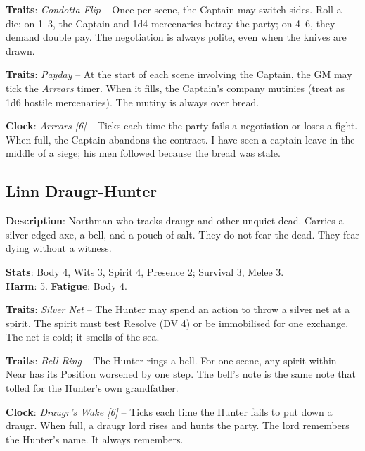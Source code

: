 \noindent\textbf{Traits}: \emph{Condotta Flip} -- Once per scene, the Captain may switch sides. Roll a die: on 1--3, the Captain and 1d4 mercenaries betray the party; on 4--6, they demand double pay. The negotiation is always polite, even when the knives are drawn.

\noindent\textbf{Traits}: \emph{Payday} -- At the start of each scene involving the Captain, the GM may tick the \emph{Arrears} timer. When it fills, the Captain's company mutinies (treat as 1d6 hostile mercenaries). The mutiny is always over bread.

\noindent\textbf{Clock}: \emph{Arrears [6]} -- Ticks each time the party fails a negotiation or loses a fight. When full, the Captain abandons the contract. I have seen a captain leave in the middle of a siege; his men followed because the bread was stale.


\subsection*{Linn Draugr-Hunter}

\noindent\textbf{Description}: Northman who tracks draugr and other unquiet dead. Carries a silver-edged axe, a bell, and a pouch of salt. They do not fear the dead. They fear dying without a witness.

\noindent\textbf{Stats}: Body 4, Wits 3, Spirit 4, Presence 2; Survival 3, Melee 3.\\
\textbf{Harm}: 5. \textbf{Fatigue}: Body 4.

\noindent\textbf{Traits}: \emph{Silver Net} -- The Hunter may spend an action to throw a silver net at a spirit. The spirit must test Resolve (DV 4) or be immobilised for one exchange. The net is cold; it smells of the sea.

\noindent\textbf{Traits}: \emph{Bell-Ring} -- The Hunter rings a bell. For one scene, any spirit within Near has its Position worsened by one step. The bell's note is the same note that tolled for the Hunter's own grandfather.

\noindent\textbf{Clock}: \emph{Draugr's Wake [6]} -- Ticks each time the Hunter fails to put down a draugr. When full, a draugr lord rises and hunts the party. The lord remembers the Hunter's name. It always remembers.


